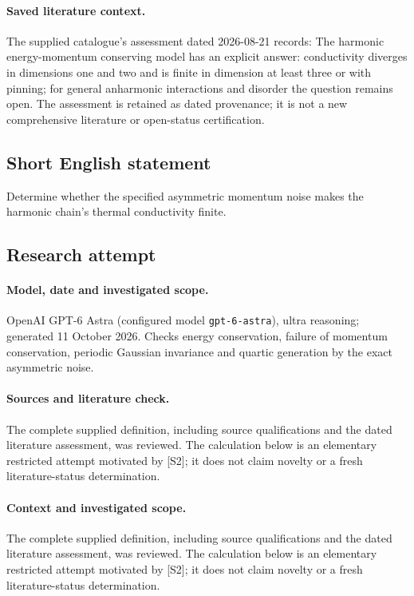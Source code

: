 \documentclass[11pt]{article}
\begin{document}
\paragraph{Saved literature context.} The supplied catalogue's assessment dated 2026-08-21 records: The harmonic energy-momentum conserving model has an explicit answer: conductivity diverges in dimensions one and two and is finite in dimension at least three or with pinning; for general anharmonic interactions and disorder the question remains open. The assessment is retained as dated provenance; it is not a new comprehensive literature or open-status certification.
\subsection{Short English statement}
Determine whether the specified asymmetric momentum noise makes the harmonic chain's thermal conductivity finite.
\subsection{Research attempt}
\paragraph{Model, date and investigated scope.}
OpenAI GPT-6 Astra (configured model \texttt{gpt-6-astra}), ultra reasoning; generated 11 October 2026. Checks energy conservation, failure of momentum conservation, periodic Gaussian invariance and quartic generation by the exact asymmetric noise.

\paragraph{Sources and literature check.}
The complete supplied definition, including source qualifications and the dated literature assessment, was reviewed. The calculation below is an elementary restricted attempt motivated by [S2]; it does not claim novelty or a fresh literature-status determination.

\paragraph{Context and investigated scope.} The complete supplied definition, including source qualifications and the dated literature assessment, was reviewed. The calculation below is an elementary restricted attempt motivated by [S2]; it does not claim novelty or a fresh literature-status determination.
\end{document}
